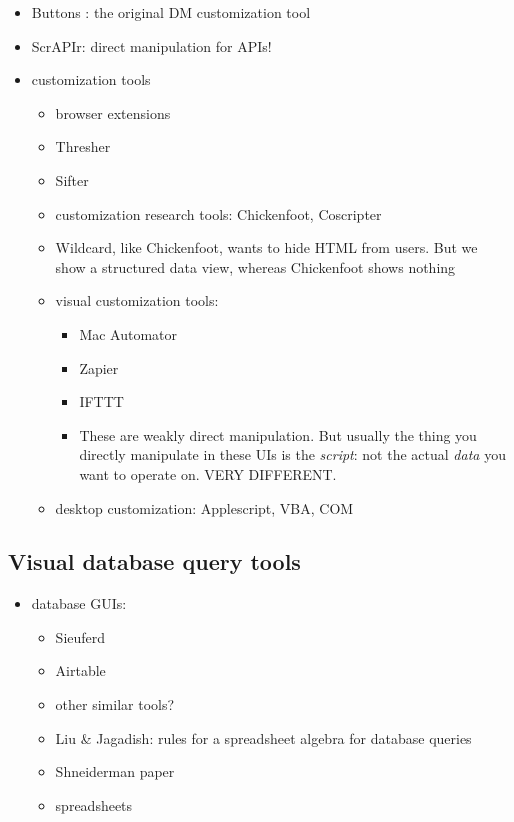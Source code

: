 \documentclass[sigplan,10pt,anonymous,review]{acmart}
\providecommand{\tightlist}{%
  \setlength{\itemsep}{0pt}\setlength{\parskip}{0pt}}
\begin{document}
\begin{itemize}
\item
  Buttons \citep{maclean1990}: the original DM customization tool
\item
  ScrAPIr: direct manipulation for APIs!
\item
  customization tools

  \begin{itemize}
  \item
    browser extensions
  \item
    Thresher
  \item
    Sifter
  \item
    customization research tools: Chickenfoot, Coscripter
  \item
    Wildcard, like Chickenfoot, wants to hide HTML from users. But we
    show a structured data view, whereas Chickenfoot shows nothing
  \item
    visual customization tools:

    \begin{itemize}
    \tightlist
    \item
      Mac Automator
    \item
      Zapier
    \item
      IFTTT
    \item
      These are weakly direct manipulation. But usually the thing you
      directly manipulate in these UIs is the \emph{script}: not the
      actual \emph{data} you want to operate on. VERY DIFFERENT.
    \end{itemize}
  \item
    desktop customization: Applescript, VBA, COM
  \end{itemize}
\end{itemize}

\hypertarget{visual-database-query-tools}{%
\subsection{Visual database query
tools}\label{visual-database-query-tools}}

\begin{itemize}
\tightlist
\item
  database GUIs:

  \begin{itemize}
  \tightlist
  \item
    Sieuferd \citep{bakke2016}
  \item
    Airtable \citep{2020a}
  \item
    other similar tools?
  \item
    Liu \& Jagadish: rules for a spreadsheet algebra for database
    queries \citep{liu2009}
  \item
    Shneiderman paper
  \item
    spreadsheets
  \end{itemize}
\end{itemize}
\end{document}
